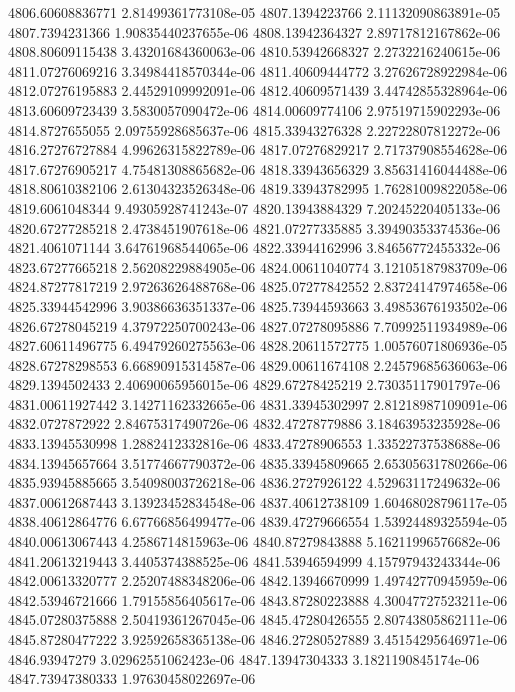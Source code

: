 {4806.60608836771 2.81499361773108e-05
4807.1394223766 2.11132090863891e-05
4807.7394231366 1.90835440237655e-06
4808.13942364327 2.89717812167862e-06
4808.80609115438 3.43201684360063e-06
4810.53942668327 2.2732216240615e-06
4811.07276069216 3.34984418570344e-06
4811.40609444772 3.27626728922984e-06
4812.07276195883 2.44529109992091e-06
4812.40609571439 3.44742855328964e-06
4813.60609723439 3.5830057090472e-06
4814.00609774106 2.97519715902293e-06
4814.8727655055 2.09755928685637e-06
4815.33943276328 2.22722807812272e-06
4816.27276727884 4.99626315822789e-06
4817.07276829217 2.71737908554628e-06
4817.67276905217 4.75481308865682e-06
4818.33943656329 3.85631416044488e-06
4818.80610382106 2.61304323526348e-06
4819.33943782995 1.76281009822058e-06
4819.6061048344 9.49305928741243e-07
4820.13943884329 7.20245220405133e-06
4820.67277285218 2.4738451907618e-06
4821.07277335885 3.39490353374536e-06
4821.4061071144 3.64761968544065e-06
4822.33944162996 3.84656772455332e-06
4823.67277665218 2.56208229884905e-06
4824.00611040774 3.12105187983709e-06
4824.87277817219 2.97263626488768e-06
4825.07277842552 2.83724147974658e-06
4825.33944542996 3.90386636351337e-06
4825.73944593663 3.49853676193502e-06
4826.67278045219 4.37972250700243e-06
4827.07278095886 7.70992511934989e-06
4827.60611496775 6.49479260275563e-06
4828.20611572775 1.00576071806936e-05
4828.67278298553 6.66890915314587e-06
4829.00611674108 2.24579685636063e-06
4829.1394502433 2.40690065956015e-06
4829.67278425219 2.73035117901797e-06
4831.00611927442 3.14271162332665e-06
4831.33945302997 2.81218987109091e-06
4832.0727872922 2.84675317490726e-06
4832.47278779886 3.18463953235928e-06
4833.13945530998 1.2882412332816e-06
4833.47278906553 1.33522737538688e-06
4834.13945657664 3.51774667790372e-06
4835.33945809665 2.65305631780266e-06
4835.93945885665 3.54098003726218e-06
4836.2727926122 4.52963117249632e-06
4837.00612687443 3.13923452834548e-06
4837.40612738109 1.60468028796117e-05
4838.40612864776 6.67766856499477e-06
4839.47279666554 1.53924489325594e-05
4840.00613067443 4.2586714815963e-06
4840.87279843888 5.16211996576682e-06
4841.20613219443 3.4405374388525e-06
4841.53946594999 4.15797943243344e-06
4842.00613320777 2.25207488348206e-06
4842.13946670999 1.49742770945959e-06
4842.53946721666 1.79155856405617e-06
4843.87280223888 4.30047727523211e-06
4845.07280375888 2.50419361267045e-06
4845.47280426555 2.80743805862111e-06
4845.87280477222 3.92592658365138e-06
4846.27280527889 3.45154295646971e-06
4846.93947279 3.02962551062423e-06
4847.13947304333 3.1821190845174e-06
4847.73947380333 1.97630458022697e-06
}
